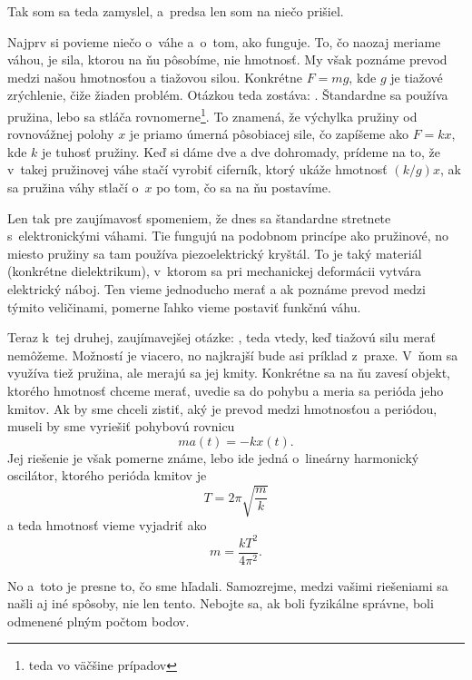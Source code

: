 Tak som sa teda zamyslel, a~predsa len som na niečo prišiel.

Najprv si povieme niečo o~váhe a~o~tom, ako funguje.
To, čo naozaj meriame váhou, je sila, ktorou na ňu pôsobíme, nie hmotnosť.
My však poznáme prevod medzi našou hmotnosťou a tiažovou silou.
Konkrétne $F = mg$, kde $g$ je tiažové zrýchlenie, čiže žiaden problém.
Otázkou teda zostáva: .
Štandardne sa používa pružina, lebo sa stláča rovnomerne\footnote{teda vo väčšine prípadov}.
To znamená, že výchylka pružiny od rovnovážnej polohy $x$ je priamo úmerná pôsobiacej sile, čo zapíšeme ako
$F = k x$, kde $k$ je tuhosť pružiny. Keď si dáme dve a dve dohromady, prídeme na to, že 
v~takej pružinovej váhe stačí vyrobiť ciferník, ktorý ukáže hmotnosť $(k/g)x$,
ak sa pružina váhy stlačí o~$x$ po tom, čo sa na ňu postavíme.

Len tak pre zaujímavosť spomeniem, že dnes sa štandardne stretnete s~elektronickými váhami.
Tie fungujú na podobnom princípe ako pružinové, no miesto pružiny sa tam používa piezoelektrický kryštál.
To je taký materiál (konkrétne dielektrikum), v~ktorom sa pri mechanickej deformácii vytvára elektrický náboj.
Ten vieme jednoducho merať a ak poznáme prevod medzi týmito veličinami, pomerne ľahko vieme postaviť funkčnú váhu.

Teraz k~tej druhej, zaujímavejšej otázke: ,
teda vtedy, keď tiažovú silu merať nemôžeme.
Možností je viacero, no najkrajší bude asi príklad z~praxe. V~ňom sa využíva tiež pružina, ale merajú sa jej kmity.
Konkrétne sa na ňu zavesí objekt, ktorého hmotnosť chceme merať, uvedie sa do pohybu a meria sa 
perióda jeho kmitov. Ak by sme chceli zistiť, aký je prevod medzi hmotnosťou a periódou,
museli by sme vyriešiť pohybovú rovnicu
$$m a(t) = -k x(t)\text{.}$$ 
Jej riešenie je však pomerne známe, lebo ide jedná o~lineárny harmonický oscilátor,
ktorého perióda kmitov je
$$T = 2 \pi \sqrt{\frac{m}{k}}$$
a teda hmotnosť vieme vyjadriť ako
$$m = \dfrac{kT^2}{4 \pi^2}\text{.}$$

No a~toto je presne to, čo sme hľadali. Samozrejme, medzi vašimi riešeniami sa našli aj iné spôsoby, nie len tento.
Nebojte sa, ak boli fyzikálne správne, boli odmenené plným počtom bodov.

